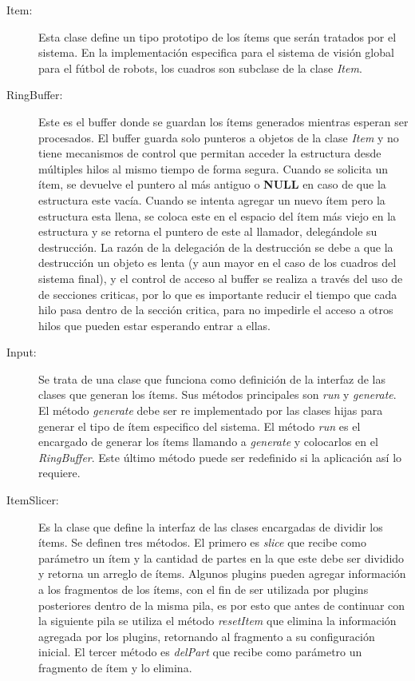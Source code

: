 \begin{description}

	\item[Item:] Esta clase define un tipo prototipo de los ítems que serán
		tratados por el sistema. En la implementación especifica para el
		sistema de visión global para el fútbol de robots, los cuadros
		son subclase de la clase \emph{Item}.

	\item[RingBuffer:] Este es el buffer donde se guardan los ítems
		generados mientras esperan ser procesados. El buffer guarda solo
		punteros a objetos de la clase \emph{Item} y no tiene mecanismos
		de control que permitan acceder la estructura desde múltiples
		hilos al mismo tiempo de forma segura. Cuando se solicita un
		ítem, se devuelve el puntero al más antiguo o \textbf{NULL} en
		caso de que la estructura este vacía. Cuando se intenta agregar
		un nuevo ítem pero la estructura esta llena, se coloca este en
		el espacio del ítem más viejo en la estructura y se retorna el
		puntero de este al llamador, delegándole su destrucción. La
		razón de la delegación de la destrucción se debe a que la
		destrucción un objeto es lenta (y aun mayor en el caso de los
		cuadros del sistema final), y el control de acceso al buffer se
		realiza a través del uso de de secciones criticas, por lo que es
		importante reducir el tiempo que cada hilo pasa dentro de la
		sección critica, para no impedirle el acceso a otros hilos que
		pueden estar esperando entrar a ellas.

	\item[Input:] Se trata de una clase que funciona como definición de la
		interfaz de las clases que generan los ítems. Sus métodos
		principales son \emph{run} y \emph{generate}. El método
		\emph{generate} debe ser re implementado por las clases hijas
		para generar el tipo de ítem especifico del sistema. El método
		\emph{run} es el encargado de generar los ítems llamando a
		\emph{generate} y colocarlos en el \emph{RingBuffer}. Este
		último método puede ser redefinido si la aplicación así lo
		requiere.

	\item[ItemSlicer:] Es la clase que define la interfaz de las clases
		encargadas de dividir los ítems. Se definen tres métodos. El
		primero es \emph{slice} que recibe como parámetro un ítem y la
		cantidad de partes en la que este debe ser dividido y retorna un
		arreglo de ítems. Algunos plugins pueden agregar información a
		los fragmentos de los ítems, con el fin de ser utilizada por
		plugins posteriores dentro de la misma pila, es por esto que
		antes de continuar con la siguiente pila se utiliza el método
		\emph{resetItem} que elimina la información agregada por los
		plugins, retornando al fragmento a su configuración inicial. El
		tercer método es \emph{delPart} que recibe como parámetro un
		fragmento de ítem y lo elimina.


\end{description}
